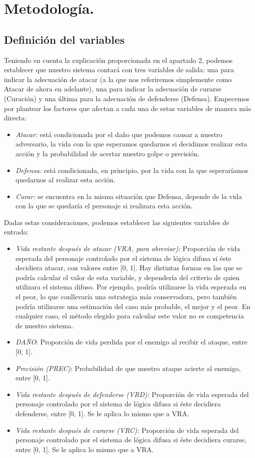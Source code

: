 \section{Metodología.}
\subsection{Definición del variables}
Teniendo en cuenta la explicación proporcionada en el apartado 2, podemos establecer que nuestro sistema contará con tres variables de salida: una para indicar la adecuación de atacar (a la que nos referiremos simplemente como Atacar de ahora en adelante), una para indicar la adecuación de curarse (Curación) y una última para la adecuación de defenderse (Defensa).
Empecemos por plantear los factores que afectan a cada una de estas variables de manera más directa:
\begin{itemize}
	\item \textit{Atacar:} está condicionada por el daño que podemos causar a nuestro adversario, la vida con la que esperamos quedarnos si decidimos realizar esta acción y la probabilidad de acertar nuestro golpe o precisión.
	\item \textit{Defensa:} está condicionada, en principio, por la vida con la que esperaríamos quedarnos al realizar esta acción.
	\item \textit{Curar:} se encuentra en la misma situación que Defensa, depende de la vida con la que se quedaría el personaje si realizara esta acción.
\end{itemize}

Dadas estas consideraciones, podemos establecer las siguientes variables de entrada:

\begin{itemize}
	\item \textit{Vida restante después de atacar (VRA, para abreviar):} Proporción de vida esperada del personaje controlado por el sistema de lógica difusa si éste decidiera atacar, con valores entre [0, 1]. Hay distintas formas en las que se podría calcular el valor de esta variable, y dependería del criterio de quien utilizara el sistema difuso. Por ejemplo, podría utilizarse la vida esperada en el peor, lo que conllevaría una estrategia más conservadora, pero también podría utilizarse una estimación del caso más probable, el mejor y el peor. En cualquier caso, el método elegido para calcular este valor no es competencia de nuestro sistema.
	\item \textit{DAÑO}: Proporción de vida perdida por el enemigo al recibir el ataque, entre [0, 1]. 
	\item \textit{Precisión (PREC)}: Probabilidad de que nuestro ataque acierte al enemigo, entre [0, 1].
	\item \textit{Vida restante después de defenderse (VRD):} Proporción de vida esperada del personaje controlado por el sistema de lógica difusa si éste decidiera defenderse, entre [0, 1]. Se le aplica lo mismo que a VRA.
	\item \textit{Vida restante después de curarse (VRC):} Proporción de vida esperada del personaje controlado por el sistema de lógica difusa si éste decidiera curarse, entre [0, 1]. Se le aplica lo mismo que a VRA. 
\end{itemize}

